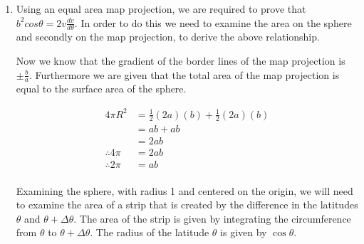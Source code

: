 \documentclass[a4paper]{article}
\begin{document}
\begin{enumerate}[label=(\alph*)]
	
	\item Using an equal area map projection, we are required to prove that $b^2cos\theta = 2v\frac{dv}{d\theta}$. In order to do this we need to examine the area on the sphere and secondly on the map projection, to derive the above relationship.

	Now we know that the gradient of the border lines of the map projection is $\pm \frac{b}{a}$. Furthermore we are given that the total area of the map projection is equal to the surface area of the sphere. 

	\begin{align*}
	4\pi R^2 & = \frac{1}{2}(2a)(b) + \frac{1}{2}(2a)(b)\\
	& = ab + ab\\
	& = 2ab\\
	\therefore 4\pi & = 2ab\\
	\therefore 2\pi & = ab\\
	\end{align*}

	Examining the sphere, with radius 1 and centered on the origin, we will need to examine the area of a strip that is created by the difference in the latitudes $\theta$ and $\theta + \Delta\theta$. The area of the strip is given by integrating the circumference from $\theta$ to $\theta + \Delta\theta$. The radius of the latitude $\theta$ is given by $\cos{\theta}$.

	\begin{center}
	\end{center}


\end{enumerate}
\end{document}
